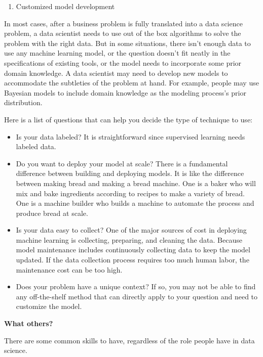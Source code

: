 \documentclass[
  12pt,
]{krantz}
\providecommand{\tightlist}{%
  \setlength{\itemsep}{0pt}\setlength{\parskip}{0pt}}
\begin{document}
\begin{enumerate}
\def\labelenumi{(\arabic{enumi})}
\setcounter{enumi}{2}
\tightlist
\item
  Customized model development
\end{enumerate}

In most cases, after a business problem is fully translated into a data science problem, a data scientist needs to use out of the box algorithms to solve the problem with the right data. But in some situations, there isn't enough data to use any machine learning model, or the question doesn't fit neatly in the specifications of existing tools, or the model needs to incorporate some prior domain knowledge. A data scientist may need to develop new models to accommodate the subtleties of the problem at hand. For example, people may use Bayesian models to include domain knowledge as the modeling process's prior distribution.

Here is a list of questions that can help you decide the type of technique to use:

\begin{itemize}
\item
  Is your data labeled? It is straightforward since supervised learning needs labeled data.
\item
  Do you want to deploy your model at scale? There is a fundamental difference between building and deploying models. It is like the difference between making bread and making a bread machine. One is a baker who will mix and bake ingredients according to recipes to make a variety of bread. One is a machine builder who builds a machine to automate the process and produce bread at scale.
\item
  Is your data easy to collect? One of the major sources of cost in deploying machine learning is collecting, preparing, and cleaning the data. Because model maintenance includes continuously collecting data to keep the model updated. If the data collection process requires too much human labor, the maintenance cost can be too high.
\item
  Does your problem have a unique context? If so, you may not be able to find any off-the-shelf method that can directly apply to your question and need to customize the model.
\end{itemize}

\textbf{What others?}

There are some common skills to have, regardless of the role people have in data science.
\end{document}
